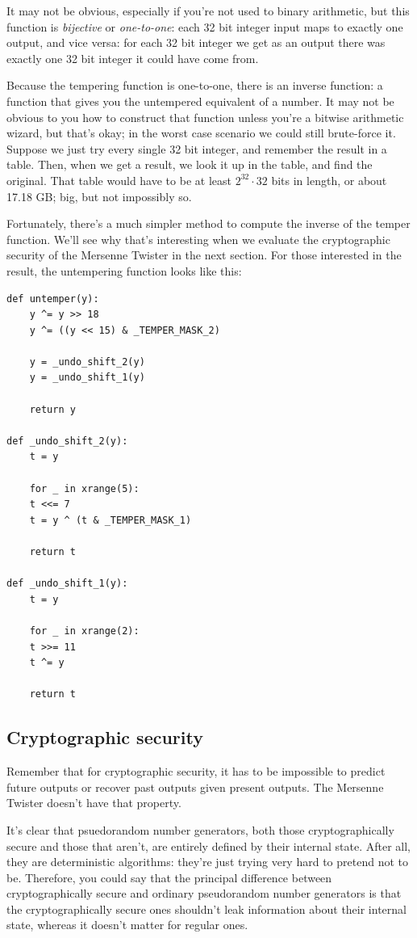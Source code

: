 \documentclass[11pt,ebook,table,dvipsnames]{memoir}
\begin{document}
It may not be obvious, especially if you're not used to binary
arithmetic, but this function is \emph{bijective} or \emph{one-to-one}: each 32
bit integer input maps to exactly one output, and vice versa: for each
32 bit integer we get as an output there was exactly one 32 bit
integer it could have come from.

Because the tempering function is one-to-one, there is an inverse
function: a function that gives you the untempered equivalent of a
number. It may not be obvious to you how to construct that function
unless you're a bitwise arithmetic wizard, but that's okay; in the
worst case scenario we could still brute-force it. Suppose we just try
every single 32 bit integer, and remember the result in a table. Then,
when we get a result, we look it up in the table, and find the
original. That table would have to be at least $2^{32} \cdot 32$ bits
in length, or about 17.18 GB; big, but not impossibly so.

Fortunately, there's a much simpler method to compute the inverse of
the temper function. We'll see why that's interesting when we evaluate
the cryptographic security of the Mersenne Twister in the next
section. For those interested in the result, the untempering function
looks like this:

\begin{verbatim}
def untemper(y):
    y ^= y >> 18
    y ^= ((y << 15) & _TEMPER_MASK_2)

    y = _undo_shift_2(y)
    y = _undo_shift_1(y)

    return y

def _undo_shift_2(y):
    t = y

    for _ in xrange(5):
	t <<= 7
	t = y ^ (t & _TEMPER_MASK_1)

    return t

def _undo_shift_1(y):
    t = y

    for _ in xrange(2):
	t >>= 11
	t ^= y

    return t
\end{verbatim}
\subsection{Cryptographic security}
\label{sec-2-10-6-5}

Remember that for cryptographic security, it has to be impossible to
predict future outputs or recover past outputs given present outputs.
The Mersenne Twister doesn't have that property.

It's clear that psuedorandom number generators, both those
cryptographically secure and those that aren't, are entirely defined
by their internal state. After all, they are deterministic algorithms:
they're just trying very hard to pretend not to be. Therefore, you
could say that the principal difference between cryptographically
secure and ordinary pseudorandom number generators is that the
cryptographically secure ones shouldn't leak information about their
internal state, whereas it doesn't matter for regular ones.
\end{document}
